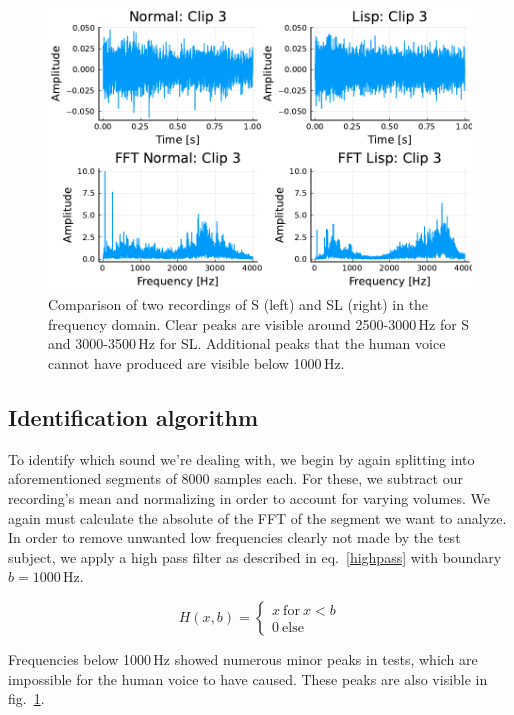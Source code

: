 \documentclass{IEEEtran}
\begin{document}
\begin{figure}[h]
\centering
\includegraphics[trim=0 0 0 145, clip, scale=0.55]{normal_vs_lisp_clip_3.pdf}
\caption{Comparison of two recordings of S (left) and SL (right) in the frequency domain. Clear peaks are visible around 2500-3000\,Hz for S and 3000-3500\,Hz for SL. Additional peaks that the human voice cannot have produced are visible below 1000\,Hz.}\label{examplefft}
\end{figure}

\subsection{Identification algorithm}\label{identify}

To identify which sound we're dealing with,
we begin by again splitting into aforementioned segments of 8000 samples each.
For these, we subtract our recording's mean and normalizing in order to account for varying volumes.
We again must calculate the absolute of the FFT of the segment we want to analyze.
In order to remove unwanted low frequencies clearly not made by the test subject,
we apply a high pass filter as described in eq.\ \ref{highpass} with boundary \(b = 1000\)\,Hz.

\begin{equation}
H(x, b) = \begin{cases} x\ \mathrm{for}\ x < b \\ 0\ \mathrm{else} \end{cases}\label{highpass}
\end{equation}

Frequencies below 1000\,Hz showed numerous minor peaks in tests,
which are impossible for the human voice to have caused.
These peaks are also visible in fig.\ \ref{examplefft}.
\end{document}
